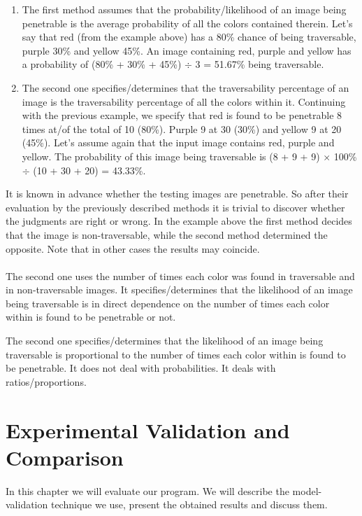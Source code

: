 \documentclass[12pt,a4paper,table,dvipsnames,tikz]{report}
\begin{document}
	\begin{enumerate}
		\item The first method assumes that the probability/likelihood of an image being penetrable is the average probability of all the colors contained therein. Let's say that red (from the example above) has a 80\% chance of being traversable, purple 30\% and yellow 45\%. An image containing red, purple and yellow has a probability of (80\% + 30\% + 45\%) $\div$ 3 = 51.67\% being traversable.
		\item The second one specifies/determines that the traversability percentage of an image is the traversability percentage of all the colors within it. Continuing with the previous example, we specify that red is found to be penetrable 8 times at/of the total of 10 (80\%). Purple 9 at 30 (30\%) and yellow 9 at 20 (45\%). Let's assume again that the input image contains red, purple and yellow. The probability of this image being traversable is (8 + 9 + 9) $\times$ 100\% $\div$ (10 + 30 + 20) = 43.33\%.
	\end{enumerate}
	
	It is known in advance whether the testing images are penetrable. So after their 
	evaluation by the previously described methods it is trivial to discover whether the 
	judgments are right or wrong. In the example above the first method decides that the 
	image is non-traversable, while the second method determined the opposite. Note that 
	in other cases the results may coincide.
	\\\\ 
	
	The second one uses the number of times each color was found in traversable and in non-traversable images. It specifies/determines that the likelihood of an image being traversable is in direct dependence on the number of times each color within is found to be penetrable or not.
	
	The second one specifies/determines that the likelihood of an image being traversable is proportional to the number of times each color within is found to be penetrable. It does not deal with probabilities. It deals with ratios/proportions.
	
	
	
	\chapter{Experimental Validation and Comparison}
	\label{sec:exp}
	
	In this chapter we will evaluate our program. We will describe the model-validation 
	technique we use, present the obtained results and discuss them.
	\\
	
\end{document}

